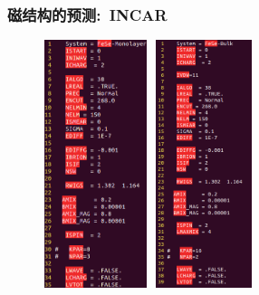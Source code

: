 \documentclass[cjk,slidestop,compress,mathserif,blue]{beamer}
\begin{document}
{
	\frametitle{\textrm{}磁结构的预测:~\textrm{INCAR}}
\begin{figure}[h!]
\vspace*{-0.11in}
\centering
\includegraphics[height=2.85in,width=1.20in]{Figures/MagGene-FeSe-monolayer-INCAR.png}
\hskip 0.3in
\includegraphics[height=2.85in,width=1.20in]{Figures/MagGene-FeSe-bulk-INCAR.png}
\label{Fig:FeSe-INCAR}
\end{figure}
}
\end{document}
